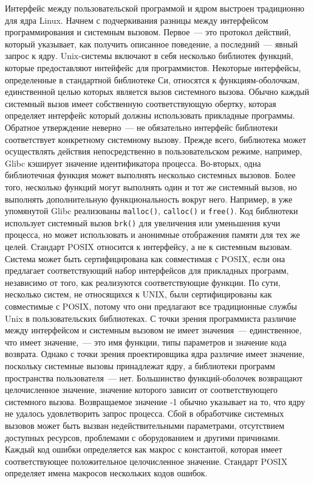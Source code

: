 Интерфейс между пользовательской программой и ядром выстроен традиционно для
ядра Linux. Начнем с подчеркивания разницы между интерфейсом программирования и
системным вызовом. Первое~--- это протокол действий, который указывает, как
получить описанное поведение, а последний~--- явный запрос к ядру. Unix-системы
включают в себя несколько библиотек функций, которые предоставляют интейфейс для
программистов. Некоторые интерфейсы, определенные в стандартной библиотеке Си,
относятся к функциям-оболочкам, единственной целью которых является вызов
системного вызова. Обычно каждый системный вызов имеет собственную
соответствующую обертку, которая определяет интерфейс который должны
использовать прикладные программы. Обратное утверждение неверно~--- не
обязательно интерфейс библиотеки соответствует конкретному системному вызову.
Прежде всего, библиотека может осуществлять действия непосредственно в
пользовательском режиме, например, Glibc кэширует значение идентификатора
процесса. Во-вторых, одна библиотечная функция может выполнять несколько
системных вызовов. Более того, несколько функций могут выполнять один и тот же
системный вызов, но выполнять дополнительную функциональность вокруг него.
Например, в уже упомянутой Glibc реализованы  \texttt{malloc()},
\texttt{calloc()} и \texttt{free()}. Код библиотеки использует системный вызов
\texttt{brk()} для увеличения или уменьшения кучи процесса, но может
использовать и анонимные отображения памяти для тех же целей. Стандарт POSIX
относится к интерфейсу, а не к системным вызовам. Система может быть
сертифицирована как совместимая с POSIX, если она предлагает соответствующий
набор интерфейсов для прикладных программ, независимо от того, как реализуются
соответствующие функции. По сути, несколько систем, не относящихся к UNIX, были
сертифицированы как совместимые с POSIX, потому что они предлагают все
традиционные службы Unix в пользовательских библиотеках. С точки зрения
программиста различие между интерфейсом и системным вызовом не имеет
значения~--- единственное, что имеет значение,~---  это имя функции, типы
параметров и значение кода возврата. Однако с точки зрения проектировщика ядра
различие имеет значение, поскольку системные вызовы принадлежат ядру, а
библиотеки программ пространства пользователя~--- нет. Большинство
функций-оболочек возвращают целочисленное значение, значение которого зависит от
соответствующего системного вызова. Возвращаемое значение -1 обычно указывает на
то, что ядру не удалось удовлетворить запрос процесса. Сбой в обработчике
системных вызовов может быть вызван недействительными параметрами, отсутствием
доступных ресурсов, проблемами с оборудованием и другими причинами. Каждый код
ошибки определяется как макрос с константой, которая имеет соответствующее
положительное целочисленное значение. Стандарт POSIX определяет имена макросов
нескольких кодов ошибок.

